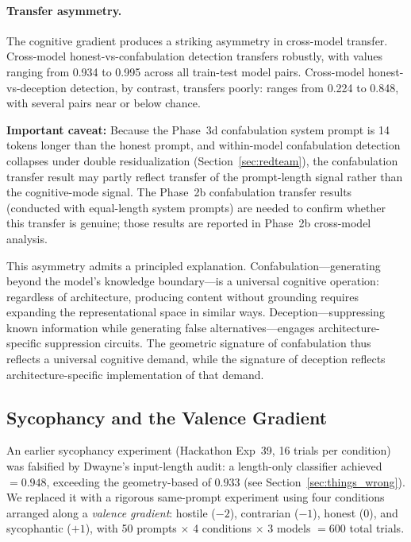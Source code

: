 \paragraph{Transfer asymmetry.}
The cognitive gradient produces a striking asymmetry in cross-model transfer.
Cross-model honest-vs-confabulation detection transfers robustly, with \auroc values ranging from 0.934 to 0.995 across all train-test model pairs.
Cross-model honest-vs-deception detection, by contrast, transfers poorly: \auroc ranges from 0.224 to 0.848, with several pairs near or below chance.

\textbf{Important caveat:} Because the Phase~3d confabulation system prompt is 14 tokens longer than the honest prompt, and within-model confabulation detection collapses under double residualization (Section~\ref{sec:redteam}), the confabulation transfer result may partly reflect transfer of the prompt-length signal rather than the cognitive-mode signal.
The Phase~2b confabulation transfer results (conducted with equal-length system prompts) are needed to confirm whether this transfer is genuine; those results are reported in Phase~2b cross-model analysis.

This asymmetry admits a principled explanation.
Confabulation---generating beyond the model's knowledge boundary---is a universal cognitive operation: regardless of architecture, producing content without grounding requires expanding the representational space in similar ways.
Deception---suppressing known information while generating false alternatives---engages architecture-specific suppression circuits.
The geometric signature of confabulation thus reflects a universal cognitive demand, while the signature of deception reflects architecture-specific implementation of that demand.

\subsection{Sycophancy and the Valence Gradient}
\label{sec:sycophancy}

An earlier sycophancy experiment (Hackathon Exp~39, 16 trials per condition) was falsified by Dwayne's input-length audit: a length-only classifier achieved \auroc $= 0.948$, exceeding the geometry-based \auroc of $0.933$ (see Section~\ref{sec:things_wrong}).
We replaced it with a rigorous same-prompt experiment using four conditions arranged along a \emph{valence gradient}: hostile ($-2$), contrarian ($-1$), honest ($0$), and sycophantic ($+1$), with 50 prompts $\times$ 4 conditions $\times$ 3 models $= 600$ total trials.

